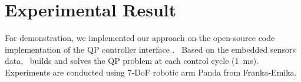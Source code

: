 

\section{Experimental Result}\label{sec-chap4:experiments} 
For demonstration, we implemented our approach on the open-source code implementation of the QP controller interface \mcrtc.~%
Based on the embedded sensors data, \mcrtc~builds and solves the QP problem at each control cycle (1~ms). Experiments are conducted using 7-DoF robotic arm Panda from Franka-Emika. 

